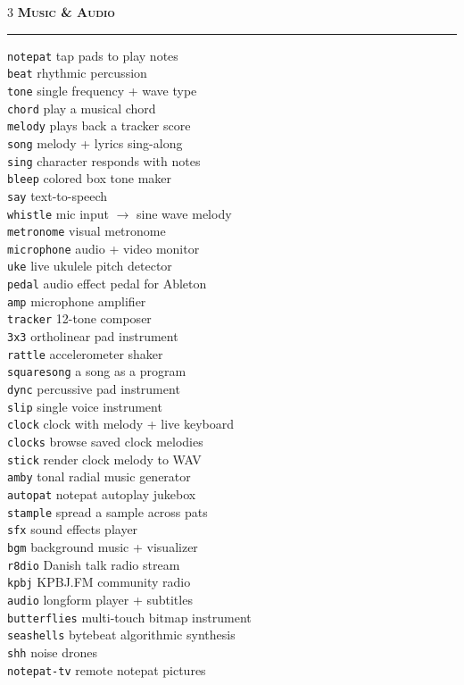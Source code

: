 \documentclass[10pt,letterpaper,twocolumn]{article}
\newcommand{\pe}[2]{\texttt{\color{acpurple}#1} #2}
\newcommand{\peh}[1]{\vspace{0.3em}\noindent\textbf{\textsc{#1}}\par\vspace{0.1em}\hrule\vspace{0.2em}}
\begin{document}
\begin{multicols}{3}
\peh{Music \& Audio}
\pe{notepat}{tap pads to play notes}\\
\pe{beat}{rhythmic percussion}\\
\pe{tone}{single frequency + wave type}\\
\pe{chord}{play a musical chord}\\
\pe{melody}{plays back a tracker score}\\
\pe{song}{melody + lyrics sing-along}\\
\pe{sing}{character responds with notes}\\
\pe{bleep}{colored box tone maker}\\
\pe{say}{text-to-speech}\\
\pe{whistle}{mic input $\rightarrow$ sine wave melody}\\
\pe{metronome}{visual metronome}\\
\pe{microphone}{audio + video monitor}\\
\pe{uke}{live ukulele pitch detector}\\
\pe{pedal}{audio effect pedal for Ableton}\\
\pe{amp}{microphone amplifier}\\
\pe{tracker}{12-tone composer}\\
\pe{3x3}{ortholinear pad instrument}\\
\pe{rattle}{accelerometer shaker}\\
\pe{squaresong}{a song as a program}\\
\pe{dync}{percussive pad instrument}\\
\pe{slip}{single voice instrument}\\
\pe{clock}{clock with melody + live keyboard}\\
\pe{clocks}{browse saved clock melodies}\\
\pe{stick}{render clock melody to WAV}\\
\pe{amby}{tonal radial music generator}\\
\pe{autopat}{notepat autoplay jukebox}\\
\pe{stample}{spread a sample across pats}\\
\pe{sfx}{sound effects player}\\
\pe{bgm}{background music + visualizer}\\
\pe{r8dio}{Danish talk radio stream}\\
\pe{kpbj}{KPBJ.FM community radio}\\
\pe{audio}{longform player + subtitles}\\
\pe{butterflies}{multi-touch bitmap instrument}\\
\pe{seashells}{bytebeat algorithmic synthesis}\\
\pe{shh}{noise drones}\\
\pe{notepat-tv}{remote notepat pictures}


\end{multicols}
\end{document}
